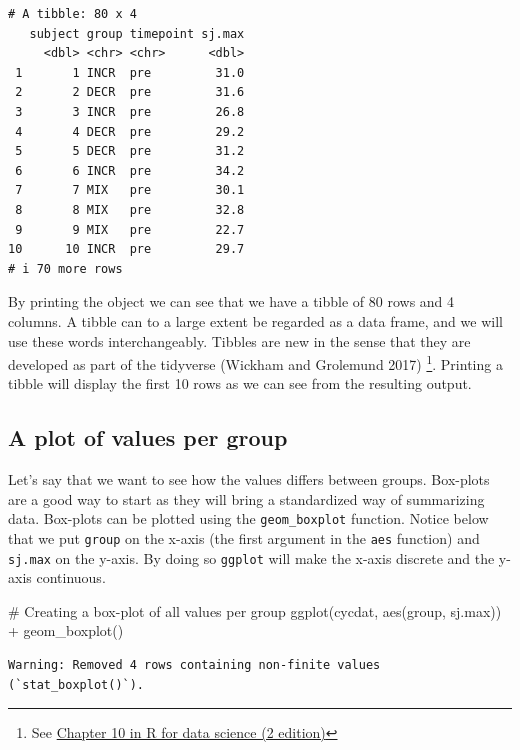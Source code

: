 \documentclass[
  11pt,
  letterpaper,
]{scrbook}
\newenvironment{Shaded}{\begin{snugshade}}{\end{snugshade}}
\newcommand{\CommentTok}[1]{\textcolor[rgb]{0.37,0.37,0.37}{#1}}
\newcommand{\FunctionTok}[1]{\textcolor[rgb]{0.28,0.35,0.67}{#1}}
\newcommand{\NormalTok}[1]{\textcolor[rgb]{0.00,0.23,0.31}{#1}}
\newcommand{\SpecialCharTok}[1]{\textcolor[rgb]{0.37,0.37,0.37}{#1}}
\begin{document}
\begin{verbatim}
# A tibble: 80 x 4
   subject group timepoint sj.max
     <dbl> <chr> <chr>      <dbl>
 1       1 INCR  pre         31.0
 2       2 DECR  pre         31.6
 3       3 INCR  pre         26.8
 4       4 DECR  pre         29.2
 5       5 DECR  pre         31.2
 6       6 INCR  pre         34.2
 7       7 MIX   pre         30.1
 8       8 MIX   pre         32.8
 9       9 MIX   pre         22.7
10      10 INCR  pre         29.7
# i 70 more rows
\end{verbatim}

By printing the object we can see that we have a tibble of 80 rows and 4
columns. A tibble can to a large extent be regarded as a data frame, and
we will use these words interchangeably. Tibbles are new in the sense
that they are developed as part of the tidyverse (Wickham and Grolemund
2017) \footnote{See \href{https://r4ds.had.co.nz/tibbles.html}{Chapter
  10 in R for data science (2 edition)}}. Printing a tibble will display
the first 10 rows as we can see from the resulting output.

\hypertarget{a-plot-of-values-per-group}{%
\subsection{A plot of values per
group}\label{a-plot-of-values-per-group}}

Let's say that we want to see how the values differs between groups.
Box-plots are a good way to start as they will bring a standardized way
of summarizing data. Box-plots can be plotted using the
\texttt{geom\_boxplot} function. Notice below that we put \texttt{group}
on the x-axis (the first argument in the \texttt{aes} function) and
\texttt{sj.max} on the y-axis. By doing so \texttt{ggplot} will make the
x-axis discrete and the y-axis continuous.

\begin{Shaded}
\begin{Highlighting}[numbers=left,,]
\CommentTok{\# Creating a box{-}plot of all values per group}
\FunctionTok{ggplot}\NormalTok{(cycdat, }\FunctionTok{aes}\NormalTok{(group, sj.max)) }\SpecialCharTok{+} \FunctionTok{geom\_boxplot}\NormalTok{()}
\end{Highlighting}
\end{Shaded}

\begin{verbatim}
Warning: Removed 4 rows containing non-finite values (`stat_boxplot()`).
\end{verbatim}
\end{document}
